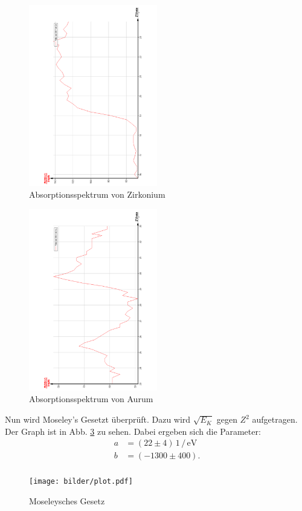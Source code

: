 \begin{figure}
  \centering
  \includegraphics[width=0.5\textwidth, angle=270]{bilder/AbsorpZr.pdf}
  \caption{Absorptionsspektrum von Zirkonium}
  \label{fig:Zirkonium}
\end{figure}
\begin{figure}
  \centering
  \includegraphics[width=0.5\textwidth, angle=270]{bilder/AbsorpAu.pdf}
  \caption{Absorptionsspektrum von Aurum}
  \label{fig:Aurum}
\end{figure}

\newpage
Nun wird Moseley's Gesetzt überprüft. Dazu wird $\sqrt{E_K}$ gegen $Z^2$ aufgetragen.
Der Graph ist in Abb. \ref{fig:Mose} zu sehen.
Dabei ergeben sich die Parameter:
\begin{align*}
  a &= (22 \pm 4) \,1\,/\, \si{\electronvolt}\\
  b &= (-1300 \pm 400). \\
\end{align*}
\begin{figure}
  \centering
  \texttt{[image: bilder/plot.pdf]}
  \caption{Moseleysches Gesetz}
  \label{fig:Mose}
\end{figure}
